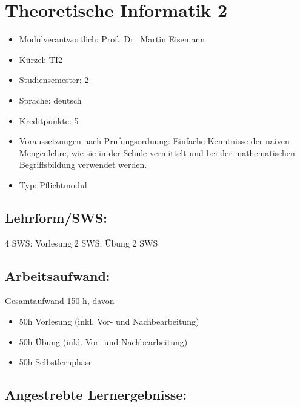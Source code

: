 \chapter{Theoretische Informatik 2}\label{theoretische-informatik-2}

\begin{itemize}
\tightlist
\item
  Modulverantwortlich: Prof.~Dr.~Martin Eisemann
\item
  Kürzel: TI2
\item
  Studiensemester: 2
\item
  Sprache: deutsch
\item
  Kreditpunkte: 5
\item
  Voraussetzungen nach Prüfungsordnung: Einfache Kenntnisse der naiven
  Mengenlehre, wie sie in der Schule vermittelt und bei der
  mathematischen Begriffsbildung verwendet werden.
\item
  Typ: Pflichtmodul
\end{itemize}

\section*{Lehrform/SWS:}\label{lehrformsws-24}

4 SWS: Vorlesung 2 SWS; Übung 2 SWS

\section*{Arbeitsaufwand:}\label{arbeitsaufwand-23}

Gesamtaufwand 150 h, davon

\begin{itemize}
\tightlist
\item
  50h Vorlesung (inkl. Vor- und Nachbearbeitung)
\item
  50h Übung (inkl. Vor- und Nachbearbeitung)
\item
  50h Selbstlernphase
\end{itemize}

\section*{Angestrebte
Lernergebnisse:}\label{angestrebte-lernergebnisse-24}

